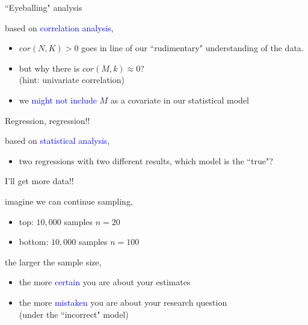 %
%
\begin{lhframe}[rhgraphic={\texttt{[image: fork2\_panel.pdf]}}]
	{``Eyeballing" analysis}
	
	based on \textcolor{blue}{correlation analysis},
	\begin{itemize}
		\item $cor(N, K)>0$ goes in line of our ``rudimentary" understanding of the data.
		\item but why there is $cor(M, k) \approx 0$? \\
		{\small (hint: univariate correlation)}
		\item we \textcolor{blue}{might not include} $M$ as a covariate in our statistical model
	\end{itemize}
\end{lhframe}
%
%
\begin{lhframe}[rhgraphic={\texttt{[image: fork2\_reg.png]}}]
	{Regression, regression!!}
	
	based on \textcolor{blue}{statistical analysis},
	\begin{itemize}
		\item two regressions with two different results, which model is the ``true"?
	\end{itemize}
\end{lhframe}
%
%
\begin{lhframe}[rhgraphic={\texttt{[image: fork2\_samplesize.pdf]}}]
	{I'll get more data!!}
	
	imagine we can continue sampling,
	\begin{itemize}
		\item top: $10,000$ samples $n=20$
		\item bottom: $10,000$ samples $n=100$
	\end{itemize}
	
	the larger the sample size,
	\begin{itemize}
		\item the more \textcolor{blue}{certain} you are about your estimates
		\item the more \textcolor{blue}{mistaken} you are about your research question \\
		{\small (under the ``incorrect" model)}
	\end{itemize}
\end{lhframe}
%
%
